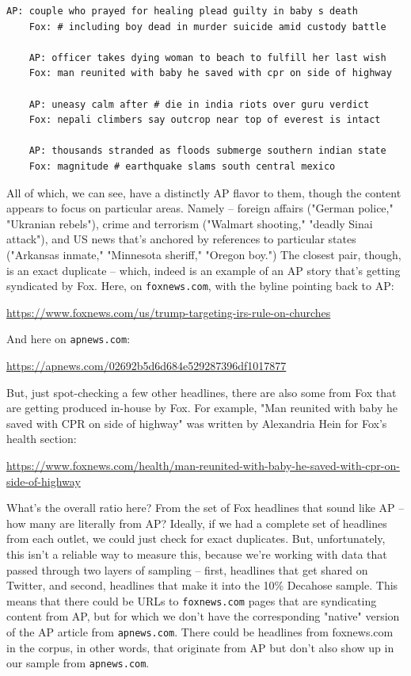 \documentclass{scrartcl}
\begin{document}
\begin{lstlisting}[basicstyle=\tiny\hlfont]
    AP: couple who prayed for healing plead guilty in baby s death
    Fox: # including boy dead in murder suicide amid custody battle

    AP: officer takes dying woman to beach to fulfill her last wish
    Fox: man reunited with baby he saved with cpr on side of highway

    AP: uneasy calm after # die in india riots over guru verdict
    Fox: nepali climbers say outcrop near top of everest is intact

    AP: thousands stranded as floods submerge southern indian state
    Fox: magnitude # earthquake slams south central mexico
\end{lstlisting}

All of which, we can see, have a distinctly AP flavor to them, though the content appears to focus on particular areas. Namely -- foreign affairs ("German police," "Ukranian rebels"), crime and terrorism ("Walmart shooting," "deadly Sinai attack"), and US news that's anchored by references to particular states ("Arkansas inmate," "Minnesota sheriff," "Oregon boy.") The closest pair, though, is an exact duplicate -- which, indeed is an example of an AP story that's getting syndicated by Fox. Here, on \texttt{foxnews.com}, with the byline pointing back to AP:

\href{https://www.foxnews.com/us/trump-targeting-irs-rule-on-churches}{https://www.foxnews.com/us/trump-targeting-irs-rule-on-churches}

And here on \texttt{apnews.com}:

\href{https://apnews.com/02692b5d6d684e529287396df1017877}{https://apnews.com/02692b5d6d684e529287396df1017877}

But, just spot-checking a few other headlines, there are also some from Fox that are getting produced in-house by Fox. For example, "Man reunited with baby he saved with CPR on side of highway" was written by Alexandria Hein for Fox's health section:

\href{https://www.foxnews.com/health/man-reunited-with-baby-he-saved-with-cpr-on-side-of-highway}{https://www.foxnews.com/health/man-reunited-with-baby-he-saved-with-cpr-on-side-of-highway}

What's the overall ratio here? From the set of Fox headlines that sound like AP -- how many are literally from AP? Ideally, if we had a complete set of headlines from each outlet, we could just check for exact duplicates. But, unfortunately, this isn't a reliable way to measure this, because we're working with data that passed through two layers of sampling -- first, headlines that get shared on Twitter, and second, headlines that make it into the 10\% Decahose sample. This means that there could be URLs to \texttt{foxnews.com} pages that are syndicating content from AP, but for which we don't have the corresponding "native" version of the AP article from \texttt{apnews.com}. There could be headlines from foxnews.com in the corpus, in other words, that originate from AP but don't also show up in our sample from \texttt{apnews.com}.
\end{document}
